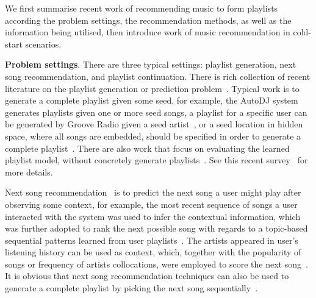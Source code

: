 

We first summarise recent work of recommending music to form playlists
according the problem settings, the recommendation methods,
as well as the information being utilised,
then introduce work of music recommendation in cold-start scenarios.


{\bf Problem settings}.
There are three typical settings:
playlist generation, next song recommendation, and playlist continuation.
%
There is rich collection of recent literature on the playlist generation or prediction
problem~\cite{platt2002learning,mcfee2011natural,mcfee2012hypergraph,chen2012playlist,ben2017groove}.
%
Typical work is to generate a complete playlist given some seed,
for example, the AutoDJ system~\cite{platt2002learning} generates playlists given one or more seed songs,
a playlist for a specific user can be generated by Groove Radio given a seed artist~\cite{ben2017groove},
or a seed location in hidden space, where all songs are embedded,
should be specified in order to generate a complete playlist~\cite{chen2012playlist}.
%
There are also work that focus on evaluating the learned playlist model,
without concretely generate playlists~\cite{mcfee2011natural,mcfee2012hypergraph}.
See this recent survey~\cite{bonnin2015automated} for more details.


Next song recommendation~\cite{hariri2012context,bonnin2013evaluating,jannach2015beyond}
is to predict the next song a user might play after observing some context,
for example, the most recent sequence of songs a user interacted with the system was used to
infer the contextual information, which was further adopted to rank the next possible song
with regards to a topic-based sequential patterns learned from user playlists~\cite{hariri2012context}.
%
The artists appeared in user's listening history can be used as context,
which, together with the popularity of songs or frequency of artists collocations,
were employed to score the next song~\cite{mcfee2012million,bonnin2013evaluating}.
%
It is obvious that next song recommendation techniques can also be used to generate a
complete playlist by picking the next song sequentially~\cite{bonnin2013evaluating,ben2017groove}.



